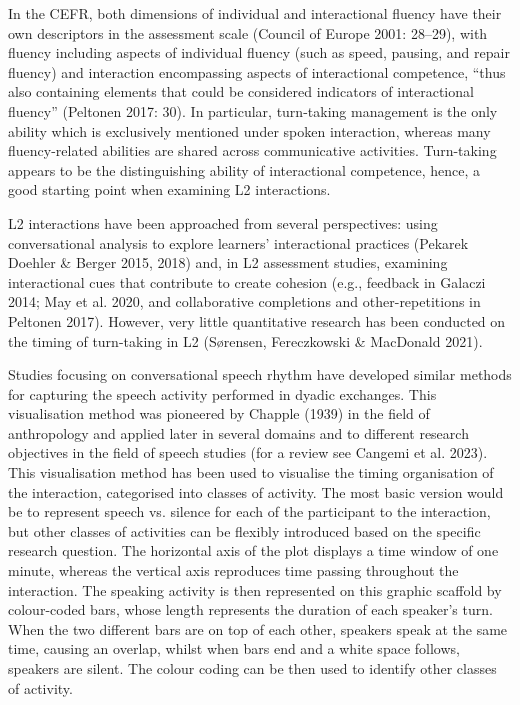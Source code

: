 \begin{styleStandard}
In the CEFR, both dimensions of individual and interactional fluency have their own descriptors in the assessment scale (Council of Europe 2001: 28–29), with fluency including aspects of individual fluency (such as speed, pausing, and repair fluency) and interaction encompassing aspects of interactional competence, “thus also containing elements that could be considered indicators of interactional fluency” (Peltonen 2017: 30). In particular, turn-taking management is the only ability which is exclusively mentioned under spoken interaction, whereas many fluency-related abilities are shared across communicative activities. Turn-taking appears to be the distinguishing ability of interactional competence, hence, a good starting point when examining L2 interactions.
\end{styleStandard}

\begin{styleStandard}
L2 interactions have been approached from several perspectives: using conversational analysis to explore learners’ interactional practices (Pekarek Doehler \& Berger 2015, 2018) and, in L2 assessment studies, examining interactional cues that contribute to create cohesion (e.g., feedback in Galaczi 2014; May et al. 2020, and collaborative completions and other-repetitions in Peltonen 2017). However, very little quantitative research has been conducted on the timing of turn-taking in L2 (Sørensen, Fereczkowski \& MacDonald 2021).
\end{styleStandard}

\begin{styleStandard}
Studies focusing on conversational speech rhythm have developed similar methods for capturing the speech activity performed in dyadic exchanges. This visualisation method was pioneered by Chapple (1939) in the field of anthropology and applied later in several domains and to different research objectives in the field of speech studies (for a review see Cangemi et al. 2023). This visualisation method has been used to visualise the timing organisation of the interaction, categorised into classes of activity. The most basic version would be to represent speech vs. silence for each of the participant to the interaction, but other classes of activities can be flexibly introduced based on the specific research question. The horizontal axis of the plot displays a time window of one minute, whereas the vertical axis reproduces time passing throughout the interaction. The speaking activity is then represented on this graphic scaffold by colour-coded bars, whose length represents the duration of each speaker’s turn. When the two different bars are on top of each other, speakers speak at the same time, causing an overlap, whilst when bars end and a white space follows, speakers are silent. The colour coding can be then used to identify other classes of activity.
\end{styleStandard}

